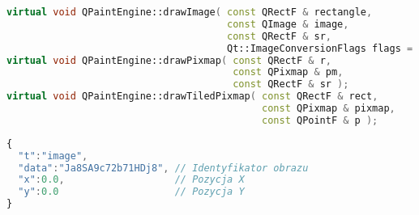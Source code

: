 \begin{lstlisting}[language=C++,numbers=none]
virtual void QPaintEngine::drawImage( const QRectF & rectangle, 
                                      const QImage & image, 
                                      const QRectF & sr, 
                                      Qt::ImageConversionFlags flags = Qt::AutoColor );
virtual void QPaintEngine::drawPixmap( const QRectF & r, 
                                       const QPixmap & pm, 
                                       const QRectF & sr );
virtual void QPaintEngine::drawTiledPixmap( const QRectF & rect, 
                                            const QPixmap & pixmap, 
                                            const QPointF & p );
\end{lstlisting}
\begin{lstlisting}[language=JavaScript,numbers=none]
{
  "t":"image",
  "data":"Ja8SA9c72b71HDj8", // Identyfikator obrazu
  "x":0.0,                   // Pozycja X
  "y":0.0                    // Pozycja Y
}
\end{lstlisting}